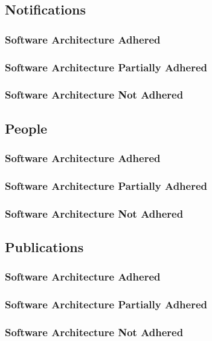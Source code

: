 \documentclass{article}
\begin{document}
    \subsection{Notifications}
        \subsubsection{Software Architecture Adhered}
        \subsubsection{Software Architecture Partially Adhered}
        \subsubsection{Software Architecture Not Adhered}       
        
    \subsection{People}
        \subsubsection{Software Architecture Adhered}
        \subsubsection{Software Architecture Partially Adhered}
        \subsubsection{Software Architecture Not Adhered}       
        
    \subsection{Publications}
        \subsubsection{Software Architecture Adhered}
        \subsubsection{Software Architecture Partially Adhered}
        \subsubsection{Software Architecture Not Adhered}       
		
\end{document}
